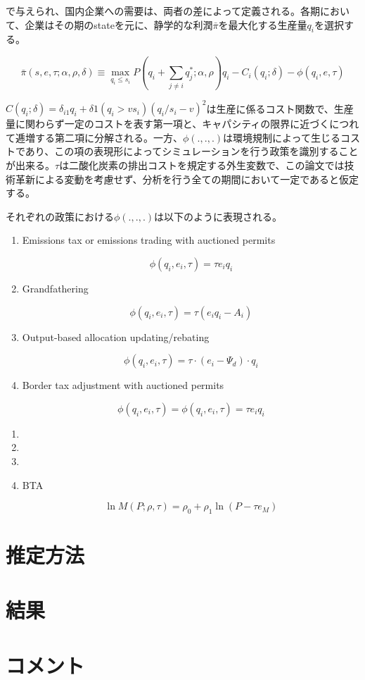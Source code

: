 \documentclass[11pt]{jsarticle}
\begin{document}
で与えられ、国内企業への需要は、両者の差によって定義される。各期において、企業はその期のstateを元に、静学的な利潤$\bar{\pi}$を最大化する生産量$q_i$を選択する。

\[
\bar{\pi}(s, e, \tau; \alpha, \rho, \delta) \equiv \max_{q_i \leq s_i} P \left( q_i + \sum_{j \neq i} q^*_j ; \alpha, \rho \right) q_i - C_i (q_i; \delta) - \phi(q_i, e, \tau)
\]

$C(q_i; \delta) = \delta_{i1}q_i + \delta 1 (q_i > v s_i) (q_i / s_i - v)^2$は生産に係るコスト関数で、生産量に関わらず一定のコストを表す第一項と、キャパシティの限界に近づくにつれて逓増する第二項に分解される。一方、$\phi(.,.,.)$は環境規制によって生じるコストであり、この項の表現形によってシミュレーションを行う政策を識別することが出来る。$\tau$は二酸化炭素の排出コストを規定する外生変数で、この論文では技術革新による変動を考慮せず、分析を行う全ての期間において一定であると仮定する。

それぞれの政策における$\phi(.,.,.)$は以下のように表現される。

\begin{enumerate}
  \item Emissions tax or emissions trading with auctioned permits

  \[
  \phi(q_i, e_i, \tau) = \tau e_i q_i
  \]

  \item Grandfathering

  \[
  \phi(q_i, e_i, \tau) = \tau(e_i q_i - A_i)
  \]

  \item Output-based allocation updating/rebating

  \[
  \phi(q_i, e_i, \tau) = \tau \cdot (e_i - \Psi_d) \cdot q_i
  \]

  \item Border tax adjustment with auctioned permits

  \[
  \phi(q_i, e_i, \tau) = \phi(q_i, e_i, \tau) = \tau e_i q_i
  \]
\end{enumerate}

\begin{enumerate}
  \item

  \item

  \item

  \item BTA

  \[
  \ln M (P; \rho, \tau) = \rho_0 + \rho_1 \ln (P - \tau e_M)
  \]
\end{enumerate}

\section{推定方法}

\section{結果}



\section{コメント}
\end{document}
